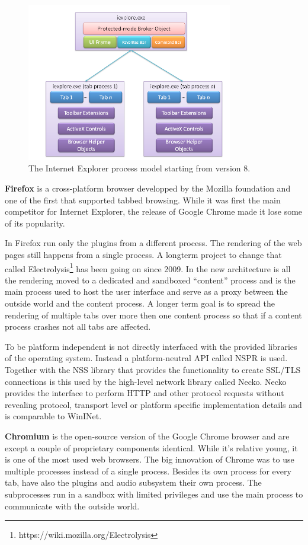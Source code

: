 \begin{figure}
    \centering
    \includegraphics[width=9cm]{Images/IE8_process_model.png}
    \caption{The Internet Explorer process model starting from version 8. \cite{zelfde msdn link, modified}}
    \label{fig:ie8proc}
\end{figure}

\textbf{Firefox} is a cross-platform browser developped by the Mozilla foundation and one of the first that supported tabbed browsing. While it was first the main competitor for Internet Explorer, the release of Google Chrome made it lose some of its popularity.

In Firefox run only the plugins from a different process. The rendering of the web pages still happens from a single process. A longterm project to change that called Electrolysis\footnote{https://wiki.mozilla.org/Electrolysis} has been going on since 2009. In the new architecture is all the rendering moved to a dedicated and sandboxed ``content'' process and is the main process used to host the user interface and serve as a proxy between the outside world and the content process. A longer term goal is to spread the rendering of multiple tabs over more then one content process so that if a content process crashes not all tabs are affected.

To be platform independent is not directly interfaced with the provided libraries of the operating system. Instead a platform-neutral API called NSPR is used. Together with the NSS library that provides the functionality to create SSL/TLS connections is this used by the high-level network library called Necko. Necko provides the interface to perform HTTP and other protocol requests without revealing protocol, transport level or platform specific implementation details and is comparable to WinINet.

\textbf{Chromium} is the open-source version of the Google Chrome browser and are except a couple of proprietary components identical. While it's relative young, it is one of the most used web browsers. The big innovation of Chrome \cite{http://blog.chromium.org/2008/09/multi-process-architecture.html} was to use multiple processes instead of a single process. Besides its own process for every tab, have also the plugins and audio subsystem their own process. The subprocesses run in a sandbox with limited privileges and use the main process to communicate with the outside world.


